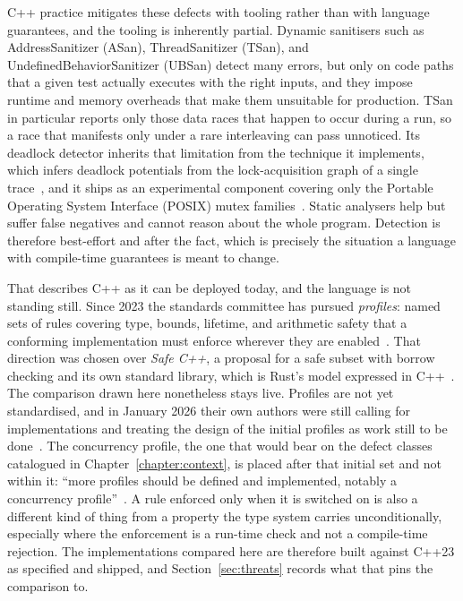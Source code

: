 \documentclass[english,oneside,a4paper,censored,csm,software-track-2020]{HYthesisML}
\begin{document}
C++ practice mitigates these defects with tooling rather than with language guarantees, and
the tooling is inherently partial. Dynamic sanitisers such as AddressSanitizer (ASan),
ThreadSanitizer (TSan), and UndefinedBehaviorSanitizer (UBSan) detect many errors, but only on
code paths that a given test actually executes with the right inputs, and they impose runtime
and memory overheads that make them unsuitable for production. TSan in particular reports only
those data races that happen to occur during a run, so a race that manifests only under a rare
interleaving can pass unnoticed. Its deadlock detector inherits that limitation from the technique
it implements, which infers deadlock potentials from the lock-acquisition graph of a single
trace~\cite{bensalem2005deadlock}, and it ships as an experimental component covering only the
Portable Operating System Interface (POSIX) mutex families~\cite{tsandeadlock}. Static
analysers help but suffer false negatives and cannot
reason about the whole program. Detection is therefore best-effort and after the fact, which
is precisely the situation a language with compile-time guarantees is meant to change.

That describes C++ as it can be deployed today, and the language is not standing still. Since
2023 the standards committee has pursued \emph{profiles}: named sets of rules covering type,
bounds, lifetime, and arithmetic safety that a conforming implementation must enforce wherever
they are enabled~\cite{sutter2025profiles}. That direction was chosen over \emph{Safe C++}, a
proposal for a safe subset with borrow checking and its own standard library, which is Rust's
model expressed in C++~\cite{baxter2024safecpp}. The comparison drawn here nonetheless stays
live. Profiles are not yet standardised, and in January 2026 their own authors were still
calling for implementations and treating the design of the initial profiles as work still to be
done~\cite{vandevoorde2026profiles}. The concurrency profile, the one that would bear on the
defect classes catalogued in Chapter~\ref{chapter:context}, is placed after that initial set and
not within it: ``more profiles should be defined and implemented, notably a concurrency
profile''~\cite{vandevoorde2026profiles}. A rule enforced only when it is switched on is also a
different kind of thing from a property the type system carries unconditionally, especially
where the enforcement is a run-time check and not a compile-time rejection. The implementations
compared here are therefore built against C++23 as specified and shipped, and
Section~\ref{sec:threats} records what that pins the comparison to.
\end{document}
